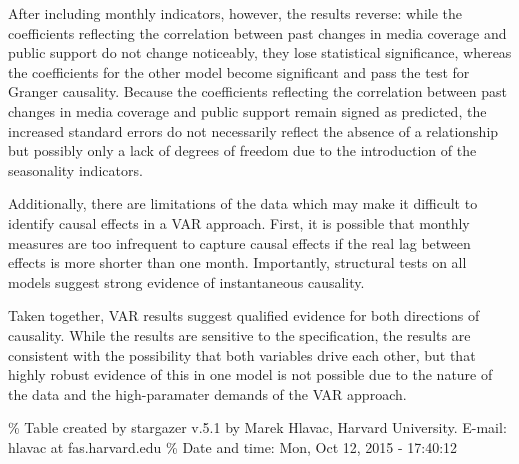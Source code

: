 \documentclass[12pt,article]{article}
\begin{document}
After including monthly indicators, however, the results reverse: while
the coefficients reflecting the correlation between past changes in
media coverage and public support do not change noticeably, they lose
statistical significance, whereas the coefficients for the other model
become significant and pass the test for Granger causality. Because the
coefficients reflecting the correlation between past changes in media
coverage and public support remain signed as predicted, the increased
standard errors do not necessarily reflect the absence of a relationship
but possibly only a lack of degrees of freedom due to the introduction
of the seasonality indicators.

Additionally, there are limitations of the data which may make it
difficult to identify causal effects in a VAR approach. First, it is
possible that monthly measures are too infrequent to capture causal
effects if the real lag between effects is more shorter than one month.
Importantly, structural tests on all models suggest strong evidence of
instantaneous causality.

Taken together, VAR results suggest qualified evidence for both
directions of causality. While the results are sensitive to the
specification, the results are consistent with the possibility that both
variables drive each other, but that highly robust evidence of this in
one model is not possible due to the nature of the data and the
high-paramater demands of the VAR approach. \pagebreak

\% Table created by stargazer v.5.1 by Marek Hlavac, Harvard University.
E-mail: hlavac at fas.harvard.edu \% Date and time: Mon, Oct 12, 2015 -
17:40:12
\end{document}
